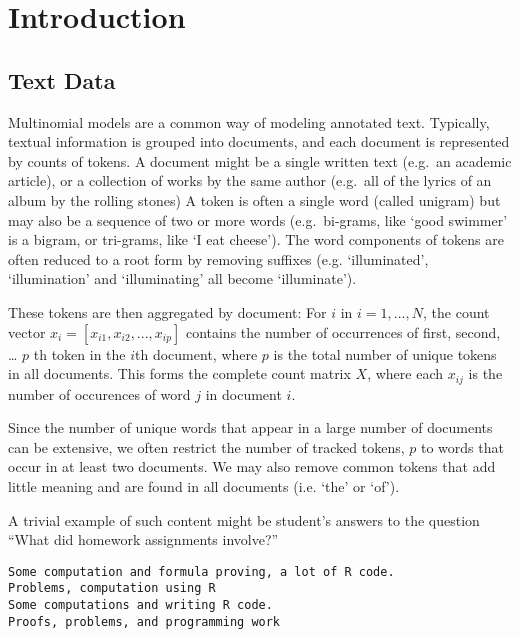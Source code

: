 \documentclass[12pt]{article}
\begin{document}
\vspace{1.5in}
\tableofcontents


\newpage


\section{Introduction}

\subsection{Text Data}


Multinomial models are a common way of modeling annotated text.
Typically, textual information is grouped into documents, and each
document is represented by counts of tokens. A document might be a
single written text (e.g.~an academic article), or a collection of works
by the same author (e.g.~all of the lyrics of an album by the rolling
stones) A token is often a single word (called unigram) but may also be
a sequence of two or more words (e.g.~bi-grams, like `good swimmer' is a
bigram, or tri-grams, like `I eat cheese'). The word components of
tokens are often reduced to a root form by removing suffixes (e.g.
`illuminated', `illumination' and `illuminating' all become
`illuminate').

These tokens are then aggregated by document: For $i$ in $i = 1,...,N$,
the count vector $x_i = [x_{i1}, x_{i2}, ... , x_{ip}]$ contains the
number of occurrences of first, second, \ldots{} $p$ th token in the
$i$th document, where $p$ is the total number of unique tokens in all
documents. This forms the complete count matrix $X$, where each $x_{ij}$
is the number of occurences of word $j$ in document $i$.

Since the number of unique words that appear in a large number of
documents can be extensive, we often restrict the number of tracked
tokens, $p$ to words that occur in at least two documents. We may also
remove common tokens that add little meaning and are found in all
documents (i.e. `the' or `of').

A trivial example of such content might be student's answers to the
question ``What did homework assignments involve?''

\begin{verbatim}
Some computation and formula proving, a lot of R code.
Problems, computation using R
Some computations and writing R code.
Proofs, problems, and programming work
\end{verbatim}
\end{document}
